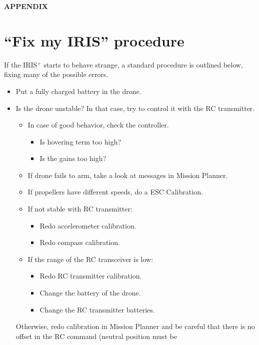 \documentclass[titlepage,11pt,a4paper]{article}
\begin{document}
\newpage
\begin{appendices}
\begin{center}
  {\bf APPENDIX}
\end{center}

\section{``Fix my IRIS'' procedure}
If the IRIS$^+$ starts to behave strange, a standard procedure is
outlined below, fixing many of the possible errors.

\begin{itemize}
  \item Put a fully charged battery in the drone.
  \item Is the drone unstable? In that case, try to control it with the RC
    transmitter.
    \begin{itemize} 
      \item In case of good behavior, check the controller.
        \begin{itemize}
          \item Is hovering term too high?
          \item Is the gains too high?
        \end{itemize}
      \item If drone fails to arm, take a look at messages in Mission
        Planner.
      \item If propellers have different speeds, do a ESC Calibration.
      \item If not stable with RC transmitter:
        \begin{itemize}
          \item Redo accelerometer calibration.
          \item Redo compass calibration.
        \end{itemize}
      \item If the range of the RC transceiver is low:
        \begin{itemize}
          \item Redo RC transmitter calibration.
          \item Change the battery of the drone.
          \item Change the RC transmitter batteries.
        \end{itemize}
    \end{itemize}
    Otherwise, redo calibration in Mission Planner and be careful that
    there is no offset in the RC command (neutral position must be

\end{itemize}
\end{appendices}
\end{document}
